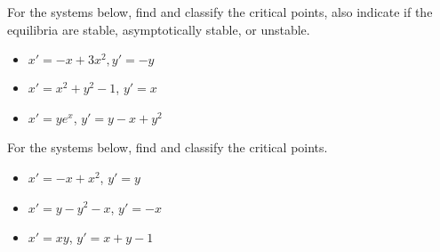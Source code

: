 \documentclass{ximera}
\begin{document}
\begin{exercise}
    For the systems below, find and classify the critical points, also indicate if the equilibria are stable, asymptotically stable, or unstable.
    \begin{itemize}
        \item $x'=-x+3x^2, y'=-y$
        \item $x'=x^2+y^2-1$, $y'=x$
        \item $x'=ye^x$, $y'=y-x+y^2$
    \end{itemize}
\end{exercise}

\begin{exercise}%
    For the systems below, find and classify the critical points.
    \begin{itemize}
        \item $x'=-x+x^2$, $y'=y$
        \item $x'=y-y^2-x$, $y'=-x$
        \item $x'=xy$, $y'=x+y-1$
    \end{itemize}
\end{exercise}
\end{document}
